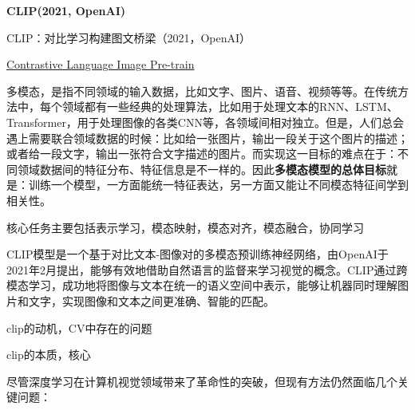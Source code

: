 \documentclass[zihao=false,fontset=windows]{ctexart}
\begin{document}
{\bfseries CLIP(2021, OpenAI)\par}
\vspace{0.15em}

\begin{feishuquote}
CLIP：对比学习构建图文桥梁（2021，OpenAI）\par
\href{https://arxiv.org/abs/2103.00020}{Contrastive Language Image Pre-train}\par
\end{feishuquote}
\begin{feishuquote}
多模态，是指不同领域的输入数据，比如文字、图片、语音、视频等等。在传统方法中，每个领域都有一些经典的处理算法，比如用于处理文本的RNN、LSTM、Transformer，用于处理图像的各类CNN等，各领域间相对独立。但是，人们总会遇上需要联合领域数据的时候：比如给一张图片，输出一段关于这个图片的描述；或者给一段文字，输出一张符合文字描述的图片。而实现这一目标的难点在于：不同领域数据间的特征分布、特征信息是不一样的。因此\textbf{多模态模型的总体目标}就是：训练一个模型，一方面能统一特征表达，另一方面又能让不同模态特征间学到相关性。\par
核心任务主要包括表示学习，模态映射，模态对齐，模态融合，协同学习\par
\end{feishuquote}
CLIP模型是一个基于对比文本-图像对的多模态预训练神经网络，由OpenAI于2021年2月提出，能够有效地借助自然语言的监督来学习视觉的概念。CLIP通过跨模态学习，成功地将图像与文本在统一的语义空间中表示，能够让机器同时理解图片和文字，实现图像和文本之间更准确、智能的匹配。\par
\par\vspace{1.15em}\par\vspace{0.28em}
clip的动机，CV中存在的问题\par
clip的本质，核心\par
\par\vspace{0.75em}\par\vspace{0.28em}
尽管深度学习在计算机视觉领域带来了革命性的突破，但现有方法仍然面临几个关键问题：\par
\end{document}
